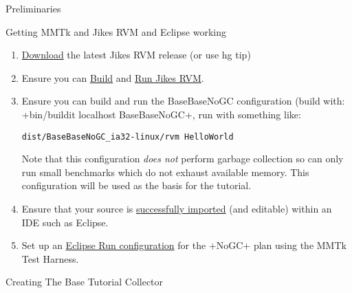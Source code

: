 \begin{chapter}{Preliminaries}
\label{cha:preliminaries}

\begin{section}{Getting MMTk and Jikes RVM and Eclipse working}
\begin{enumerate}
  \item \hyperref[cha:getthesource]{Download} the latest Jikes RVM release (or use hg tip)
  \item Ensure you can \hyperref[cha:buildingjikesrvm]{Build} and \hyperref[cha:runningjikesrvm]{Run Jikes RVM}.
  \item Ensure you can build and run the BaseBaseNoGC configuration (build with: \spverb+bin/buildit localhost BaseBaseNoGC+, run with something like:
    \begin{lstlisting}
dist/BaseBaseNoGC_ia32-linux/rvm HelloWorld
    \end{lstlisting}
    Note that this configuration \textit{does not} perform garbage collection so can only run small benchmarks which do not exhaust available memory. This configuration will be used as the basis for the tutorial.
  \item Ensure that your source is \hyperref[sec:editingjikesrvminanide]{successfully imported} (and editable) within an IDE such as Eclipse.
  \item Set up an \hyperref[cha:themmtktestharness]{Eclipse Run configuration} for the \spverb+NoGC+ plan using the MMTk Test Harness.
\end{enumerate}

\end{section}

\begin{section}{Creating The Base Tutorial Collector}


\end{section}
\end{chapter}

